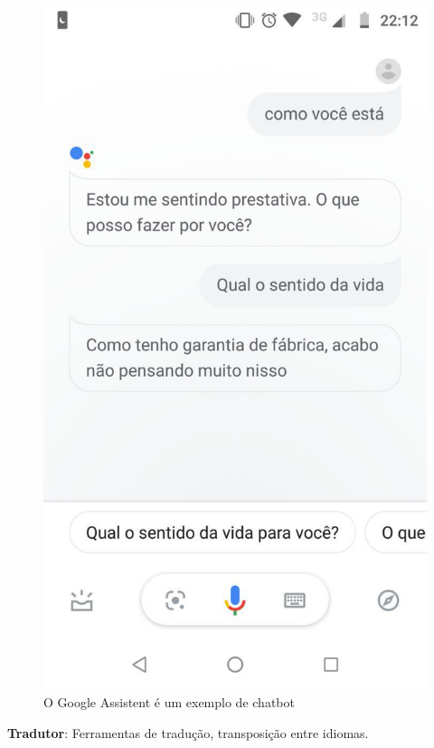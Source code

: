 \documentclass{article}
\begin{document}
\begin{figure}[H]
    \centering
    \includegraphics[scale=0.3]{imagens/chatbot.jpg}
    \caption{O Google Assistent é um exemplo de chatbot}
    \label{fig:chatbot}
\end{figure}{}
\textbf{Tradutor}: Ferramentas de tradução, transposição entre idiomas.\\
\end{document}
